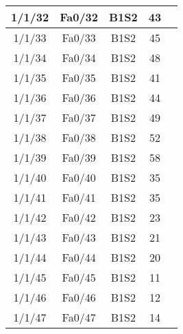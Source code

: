 \begin{center}
\begin{longtable}{|c|c|c|c|c|}
	1/1/32 & Fa0/32 & B1S2 & 43 \\ \hline
	1/1/33 & Fa0/33 & B1S2 & 45 \\ \hline
	1/1/34 & Fa0/34 & B1S2 & 48 \\ \hline
	1/1/35 & Fa0/35 & B1S2 & 41 \\ \hline
	1/1/36 & Fa0/36 & B1S2 & 44 \\ \hline
	1/1/37 & Fa0/37 & B1S2 & 49 \\ \hline
	1/1/38 & Fa0/38 & B1S2 & 52 \\ \hline
	1/1/39 & Fa0/39 & B1S2 & 58 \\ \hline
	1/1/40 & Fa0/40 & B1S2 & 35 \\ \hline
	1/1/41 & Fa0/41 & B1S2 & 35 \\ \hline
	1/1/42 & Fa0/42 & B1S2 & 23 \\ \hline
	1/1/43 & Fa0/43 & B1S2 & 21 \\ \hline
	1/1/44 & Fa0/44 & B1S2 & 20 \\ \hline
	1/1/45 & Fa0/45 & B1S2 & 11 \\ \hline
	1/1/46 & Fa0/46 & B1S2 & 12 \\ \hline
	1/1/47 & Fa0/47 & B1S2 & 14 \\ \hline

    \end{longtable}
\end{center}


